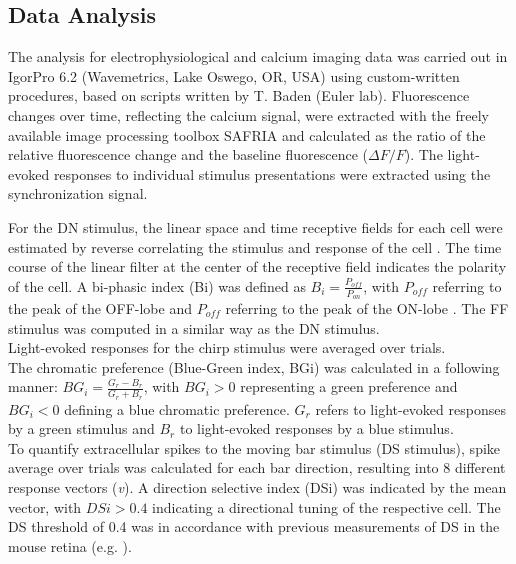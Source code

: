 \subsection{Data Analysis}
The analysis for electrophysiological and calcium imaging data was carried out in IgorPro 6.2 (Wavemetrics, Lake Oswego, OR, USA) using custom-written procedures, based on scripts written by T. Baden (Euler lab). Fluorescence changes over time, reflecting the calcium signal, were extracted with the freely available image processing toolbox SAFRIA \citep{dorostkar10} and calculated as the ratio of the relative fluorescence change and the baseline fluorescence ($\Delta F/F$). The light-evoked responses to individual stimulus presentations were extracted using the synchronization signal. 

For the DN stimulus, the linear space and time receptive fields for each cell were estimated by reverse correlating the stimulus and response of the cell \citep{chichilnisky01, wang11}. The time course of the linear filter at the center of the receptive field indicates the polarity of the cell. A bi-phasic index (Bi) was defined as $B_{i}=\frac{P_{off}}{P_{on}}$, with $P_{off}$ referring to the peak of the OFF-lobe and $P_{off}$ referring to the peak of the ON-lobe \citep{chander01}. The FF stimulus was computed in a similar way as the DN stimulus.\\
Light-evoked responses for the chirp stimulus were averaged over trials. \\
The chromatic preference (Blue-Green index, BGi) was calculated in a following manner: $BG_{i}=\frac{G_{r}-B_{r}}{ G_{r}+B_{r}}$, with $BG_{i} > 0$ representing a green preference and $BG_{i} < 0$ defining a blue chromatic preference. $G_{r}$ refers to light-evoked responses by a green stimulus and $B_{r}$ to light-evoked responses by a blue stimulus.\\
To quantify extracellular spikes to the moving bar stimulus (DS stimulus), spike average over trials was calculated for each bar direction, resulting into 8 different response vectors (\emph{v}). A direction selective index (DSi) was indicated by the mean vector, with $DSi > 0.4$ indicating a directional tuning of the respective cell. The DS threshold of 0.4 was in accordance with previous measurements of DS in the mouse retina (e.g. \citealp{auferkorte12, rivlinetzion11}).

